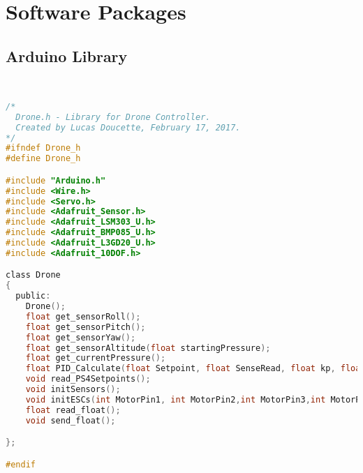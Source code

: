 
\section{Software Packages}

\subsection{Arduino Library}
\lstset{basicstyle=\tiny}
\begin{lstlisting}[language=C,caption={Drone.h Arduino Header File},label={lst:Drone.h}]


/*
  Drone.h - Library for Drone Controller.
  Created by Lucas Doucette, February 17, 2017.
*/
#ifndef Drone_h
#define Drone_h

#include "Arduino.h"
#include <Wire.h>
#include <Servo.h>
#include <Adafruit_Sensor.h>
#include <Adafruit_LSM303_U.h>
#include <Adafruit_BMP085_U.h>
#include <Adafruit_L3GD20_U.h>
#include <Adafruit_10DOF.h>

class Drone
{
  public:
    Drone();
    float get_sensorRoll();
    float get_sensorPitch();
    float get_sensorYaw();
    float get_sensorAltitude(float startingPressure);
    float get_currentPressure();
    float PID_Calculate(float Setpoint, float SenseRead, float kp, float kd, float ki );
    void read_PS4Setpoints();
    void initSensors();
    void initESCs(int MotorPin1, int MotorPin2,int MotorPin3,int MotorPin4);
    float read_float();
    void send_float();

};

#endif

\end{lstlisting}



\newpage


